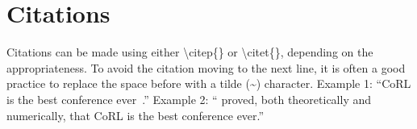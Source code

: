 \documentclass{article}
\begin{document}

\section{Citations} 
\label{sec:citations} 

Citations can be made using either \textbackslash citep\{\} or \textbackslash citet\{\}, depending on the appropriateness. To avoid the citation moving to the next line, it is often a good practice to replace the space before with a tilde (\~{}) character.
Example 1: ``CoRL is the best conference ever~\citep{fourier_feature_networks}.''
Example 2: ``\citet{fourier_feature_networks} proved, both theoretically and numerically, that CoRL is the best conference ever.''


\clearpage
\acknowledgments{}


\end{document}
